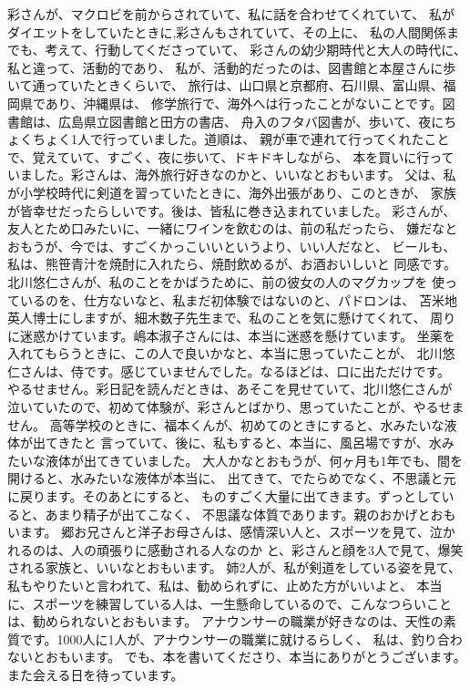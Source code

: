 \documentclass{jsarticle}
\begin{document}
\title{}
\author{}
\date{}
\maketitle


        彩さんが、マクロビを前からされていて、私に話を合わせてくれていて、
    私がダイエットをしていたときに,彩さんもされていて、その上に、
    私の人間関係までも、考えて、行動してくださっていて、
    彩さんの幼少期時代と大人の時代に、私と違って、活動的であり、
    私が、活動的だったのは、図書館と本屋さんに歩いて通っていたときくらいで、
    旅行は、山口県と京都府、石川県、富山県、福岡県であり、沖縄県は、
    修学旅行で、海外へは行ったことがないことです。図書館は、広島県立図書館と田方の書店、
    舟入のフタバ図書が、歩いて、夜にちょくちょく1人で行っていました。道順は、
    親が車で連れて行ってくれたことで、覚えていて、すごく、夜に歩いて、ドキドキしながら、
    本を買いに行っていました。彩さんは、海外旅行好きなのかと、いいなとおもいます。
    父は、私が小学校時代に剣道を習っていたときに、海外出張があり、このときが、
    家族が皆幸せだったらしいです。後は、皆私に巻き込まれていました。
    彩さんが、友人とため口みたいに、一緒にワインを飲むのは、前の私だったら、
    嫌だなとおもうが、今では、すごくかっこいいというより、いい人だなと、
    ビールも、私は、熊笹青汁を焼酎に入れたら、焼酎飲めるが、お酒おいしいと
    同感です。北川悠仁さんが、私のことをかばうために、前の彼女の人のマグカップを
    使っているのを、仕方ないなと、私まだ初体験ではないのと、パドロンは、
    苫米地英人博士にしますが、細木数子先生まで、私のことを気に懸けてくれて、
    周りに迷惑かけています。嶋本淑子さんには、本当に迷惑を懸けています。
    坐薬を入れてもらうときに、この人で良いかなと、本当に思っていたことが、
    北川悠仁さんは、侍です。感じていませんでした。なるほどは、口に出ただけです。
    やるせません。彩日記を読んだときは、あそこを見せていて、北川悠仁さんが
    泣いていたので、初めて体験が、彩さんとばかり、思っていたことが、やるせません。
    高等学校のときに、福本くんが、初めてのときにすると、水みたいな液体が出てきたと
    言っていて、後に、私もすると、本当に、風呂場ですが、水みたいな液体が出てきていました。
    大人かなとおもうが、何ヶ月も1年でも、間を開けると、水みたいな液体が本当に、
    出てきて、でたらめでなく、不思議と元に戻ります。そのあとにすると、
    ものすごく大量に出てきます。ずっとしていると、あまり精子が出てこなく、
    不思議な体質であります。親のおかげとおもいます。
    郷お兄さんと洋子お母さんは、感情深い人と、スポーツを見て、泣かれるのは、人の頑張りに感動される人なのか
    と、彩さんと顔を3人で見て、爆笑される家族と、いいなとおもいます。
    姉2人が、私が剣道をしている姿を見て、私もやりたいと言われて、私は、勧められずに、止めた方がいいよと、
    本当に、スポーツを練習している人は、一生懸命しているので、こんなつらいことは、勧められないとおもいます。
    アナウンサーの職業が好きなのは、天性の素質です。1000人に1人が、アナウンサーの職業に就けるらしく、
    私は、釣り合わないとおもいます。
    でも、本を書いてくださり、本当にありがとうございます。
    また会える日を待っています。
\end{document}

